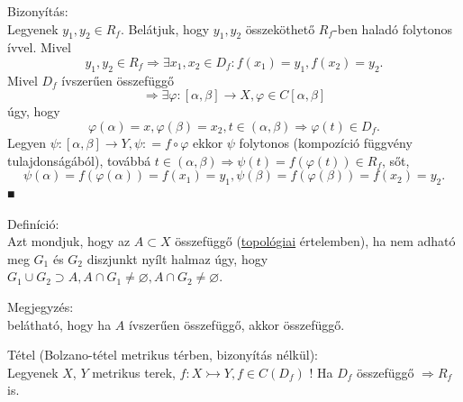 \documentclass[12pt,a4paper]{scrartcl}
\newenvironment{definicio}{}{}
\newenvironment{tetel}{}{}
\newenvironment{bizonyitas}{}{}
\newenvironment{megjegyzes}{}{}
\begin{document}
\begin{bizonyitas}

Bizonyítás:\\
Legyenek \(y_{1},y_{2} \in R_{f}\). Belátjuk, hogy \(y_{1},y_{2}\)
összeköthető \(R_{f}\)-ben haladó folytonos ívvel. Mivel
\[\left. y_{1},y_{2} \in R_{f}\Rightarrow\exists x_{1},x_{2} \in D_{f}:f\left( x_{1} \right) = y_{1},f\left( x_{2} \right) = y_{2} \right..\]
Mivel \(D_{f}\) ívszerűen összefüggő
\[\left. \Rightarrow\exists\varphi:\left\lbrack {\alpha,\beta} \right\rbrack\rightarrow X,\varphi \in C\left\lbrack {\alpha,\beta} \right\rbrack \right.\]
úgy, hogy
\[\left. \varphi\left( \alpha \right) = x,\varphi\left( \beta \right) = x_{2},t \in \left( {\alpha,\beta} \right)\Rightarrow\varphi\left( t \right) \in D_{f}. \right.\]
Legyen
\(\left. \psi:\left\lbrack {\alpha,\beta} \right\rbrack\rightarrow Y,\psi: = f \circ \varphi \right.\)
ekkor \(\psi\) folytonos (kompozíció függvény tulajdonságából), továbbá
\(\left. t \in \left( {\alpha,\beta} \right)\Rightarrow\psi\left( t \right) = f\left( {\varphi\left( t \right)} \right) \in R_{f} \right.\),
sőt,
\[\psi\left( \alpha \right) = f\left( {\varphi\left( \alpha \right)} \right) = f\left( x_{1} \right) = y_{1},\psi\left( \beta \right) = f\left( {\varphi\left( \beta \right)} \right) = f\left( x_{2} \right) = y_{2}.\]
■

\end{bizonyitas}

\begin{definicio}

Definíció:\\
Azt mondjuk, hogy az \(A \subset X\) összefüggő
(\href{https://hu.wikipedia.org/wiki/Topol\%C3\%B3gia}{topológiai}
értelemben), ha nem adható meg \(G_{1}\) és \(G_{2}\) diszjunkt nyílt
halmaz úgy, hogy
\(G_{1} \cup G_{2} \supset A,A \cap G_{1} \neq \varnothing,A \cap G_{2} \neq \varnothing\).

\end{definicio}

\begin{megjegyzes}

Megjegyzés:\\
belátható, hogy ha \(A\) ívszerűen összefüggő, akkor összefüggő.

\end{megjegyzes}

\begin{tetel}

Tétel (Bolzano-tétel metrikus térben, bizonyítás nélkül):\\
Legyenek \(X\), \(Y\) metrikus terek,
\(\left. f:X\rightarrowtail Y,f \in C\left( D_{f} \right) \right.\) ! Ha
\(D_{f}\) összefüggő \(\left. \Rightarrow R_{f} \right.\) is.

\end{tetel}
\end{document}
